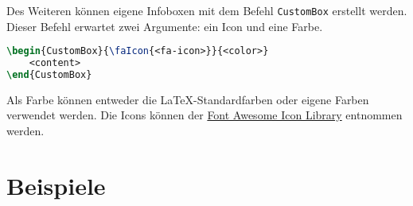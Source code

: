 	Des Weiteren können eigene Infoboxen mit dem Befehl \texttt{CustomBox} erstellt werden. Dieser Befehl erwartet zwei Argumente: ein Icon und eine Farbe.
	\smallskip
	\begin{lstlisting}[language=tex]
\begin{CustomBox}{\faIcon{<fa-icon>}}{<color>}
    <content>
\end{CustomBox}
\end{lstlisting}
	\smallskip
	Als Farbe können entweder die \LaTeX-Standardfarben oder eigene Farben verwendet werden. Die Icons können der \href{https://fontawesome.com/icons?d=gallery&m=free}{Font Awesome Icon Library} entnommen werden.

	\section{Beispiele}

